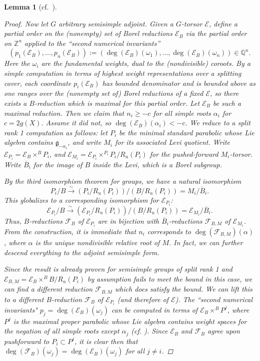 \documentclass[openany]{amsbook}
\newtheorem{lemma}[theorem]{Lemma}
\theoremstyle{definition}
\theoremstyle{remark}
\numberwithin{equation}{section}
\newcommand{\Q}{\mathbb{Q}}
\newcommand{\Z}{\mathbb{Z}}
\newcommand{\cF}{\mathcal{F}}
\newcommand{\cE}{\mathcal{E}}
\newcommand{\ol}[1]{\overline{#1}}
\renewcommand{\-}{\operatorname{-}}
\renewcommand{\fg}{\mathfrak{g}}
\begin{document}
\begin{lemma}[{{cf.\ \cite[Prop. 6.1.6]{CLI}}}]
\begin{proof}
        Now let $G$ arbitrary semisimple adjoint. Given a $G$-torsor $\cE$, define a partial order on the (nonempty) set of Borel reductions $\cE_B$ via the partial order on $\Z^n$ applied to the ``second numerical invariants'' 
        $$
        (p_1(\cE_B),\ldots, p_n(\cE_B)) :=(\deg(\cE_B)(\omega_1), \ldots, \deg(\cE_B)(\omega_n)) \in \Q^n.
        $$
        Here the $\omega_i$ are the fundamental weights, dual to the (nondivisible) coroots.
        By a simple computation in terms of highest weight representations over a splitting cover, each coordinate $p_i(\cE_B)$ has bounded denominator and is bounded above as one ranges over the (nonempty set of) Borel reductions of a fixed $\cE$, so there exists a $B$-reduction which is maximal for this partial order. Let $\cE_B$ be such a maximal reduction. Then we claim that $n_i \ge -c$ for all simple roots $\alpha_i$ for $c = 2g(X)$.          
        Assume it did not, so $\deg(\cE_B)(\alpha_i) < - c$. We reduce to a split rank 1 computation as follows: let $P_i$ be the minimal standard parabolic whose Lie algebra contains $\fg_{-\alpha_i}$, and write $M_i$ for its associated Levi quotient. Write $\cE_{P_i} = \cE_B \times^B P_i$, and $\cE_{M_i} = \cE_{P_i} \times^{P_i} P_i/R_u(P_i)$ for the pushed-forward $M_i$-torsor. Write $\ol{B}_i$ for the image of $B$ inside the Levi, which is a Borel subgroup.

        By the third isomorphism theorem for groups, we have a natural isomorphism
        $$
        P_i/B \xrightarrow{\sim} (P_i/R_u(P_i))/(B/R_u(P_i)) = M_i/\ol{B}_i.$$
        This globalizes to a corresponding isomorphism for $\cE_{P_i}$:
        $$
        \cE_{P_i}/B \xrightarrow{\sim} (\cE_{P_i}/R_u(P_i))/(B/R_u(P_i)) = \cE_{M_i}/\ol{B}_i.$$
        Thus, $B$-reductions $\cF_B$ of $\cE_{P_i}$ are in bijection with $\ol{B}_i$-reductions $\cF_{B,M}$ of $\cE_{M_i}$. From the construction, it is immediate that $n_i$ corresponds to $\deg(\cF_{B,M})(\alpha)$, where $\alpha$ is the unique nondivisible relative root of $M$. In fact, we can further descend everything to the adjoint semisimple form. 
        
        Since the result is already proven for semisimple groups of split rank 1 and $\cE_{B,M} = \cE_B \times^B B/R_u(P_i)$ by assumption fails to meet the bound in this case, we can find a different reduction $\cF_{B, M}$ which does satisfy the bound. We can lift this to a different $B$-reduction $\cF_B$ of $\cE_{P_i}$ (and therefore of $\cE$). The ``second numerical invariants" $p_j = \deg(\cE_B)(\omega_j)$ can be computed in terms of $\cE_B \times^B P^j$, where $P^j$ is the \textit{maximal} proper parabolic whose Lie algebra contains weight spaces for the negation of all simple roots \textit{except} $\alpha_j$ (cf. \cite[\S 2.1]{harderborels}). Since $\cE_B$ and $\cF_B$ agree upon pushforward to $P_i \subset P^j$, it is clear then that $\deg(\cF_B)(\omega_j) = \deg(\cE_B)(\omega_j)$ for all $j \neq i$. 


\end{proof}
\end{lemma}
\end{document}
